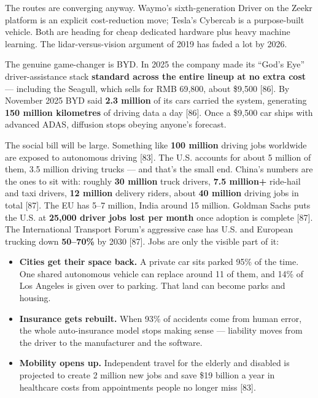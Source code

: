 \documentclass[11pt,a4paper]{article}
\begin{document}
The routes are converging anyway. Waymo's sixth-generation Driver on the Zeekr platform is an explicit cost-reduction move; Tesla's Cybercab is a purpose-built vehicle. Both are heading for cheap dedicated hardware plus heavy machine learning. The lidar-versus-vision argument of 2019 has faded a lot by 2026.

The genuine game-changer is BYD. In 2025 the company made its ``God's Eye'' driver-assistance stack \textbf{standard across the entire lineup at no extra cost} --- including the Seagull, which sells for RMB 69,800, about \$9,500 [86]. By November 2025 BYD said \textbf{2.3 million} of its cars carried the system, generating \textbf{150 million kilometres} of driving data a day [86]. Once a \$9,500 car ships with advanced ADAS, diffusion stops obeying anyone's forecast.

The social bill will be large. Something like \textbf{100 million} driving jobs worldwide are exposed to autonomous driving [83]. The U.S. accounts for about 5 million of them, 3.5 million driving trucks --- and that's the small end. China's numbers are the ones to sit with: roughly \textbf{30 million} truck drivers, \textbf{7.5 million+} ride-hail and taxi drivers, \textbf{12 million} delivery riders, about \textbf{40 million} driving jobs in total [87]. The EU has 5--7 million, India around 15 million. Goldman Sachs puts the U.S. at \textbf{25,000 driver jobs lost per month} once adoption is complete [87]. The International Transport Forum's aggressive case has U.S. and European trucking down \textbf{50--70\%} by 2030 [87]. Jobs are only the visible part of it:

\begin{itemize}
  \item \textbf{Cities get their space back.} A private car sits parked 95\% of the time. One shared autonomous vehicle can replace around 11 of them, and 14\% of Los Angeles is given over to parking. That land can become parks and housing.
  \item \textbf{Insurance gets rebuilt.} When 93\% of accidents come from human error, the whole auto-insurance model stops making sense --- liability moves from the driver to the manufacturer and the software.
  \item \textbf{Mobility opens up.} Independent travel for the elderly and disabled is projected to create 2 million new jobs and save \$19 billion a year in healthcare costs from appointments people no longer miss [83].
\end{itemize}
\end{document}
